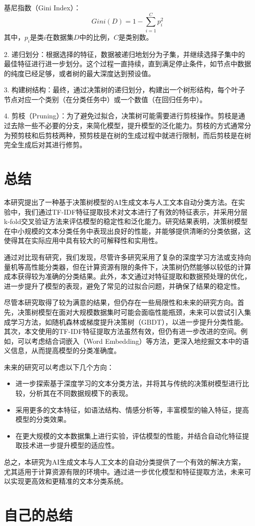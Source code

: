\documentclass[UTF8]{ctexart}
\begin{document}
   基尼指数（Gini Index）：
   \[
   Gini(D) = 1 - \sum_{i=1}^{C} p_i^2
   \]
   其中，\(p_i\)是类\(i\)在数据集\(D\)中的比例，\(C\)是类别数。

2. 递归划分：根据选择的特征，数据被递归地划分为子集，并继续选择子集中的最佳特征进行进一步划分。这个过程一直持续，直到满足停止条件，如节点中数据的纯度已经足够，或者树的最大深度达到预设值。

3. 构建树结构：最终，通过决策树的递归划分，构建出一个树形结构，每个叶子节点对应一个类别（在分类任务中）或一个数值（在回归任务中）。

4. 剪枝（Pruning）：为了避免过拟合，决策树可能需要进行剪枝操作。剪枝是通过去除一些不必要的分支，来简化模型，提升模型的泛化能力。剪枝的方式通常分为预剪枝和后剪枝两种，预剪枝是在树的生成过程中就进行限制，而后剪枝是在树完全生成后对其进行修剪。
\section{总结}

本研究提出了一种基于决策树模型的AI生成文本与人工文本自动分类方法。在实验中，我们通过TF-IDF特征提取技术对文本进行了有效的特征表示，并采用分层k-fold交叉验证方法来评估模型的稳定性和泛化能力。研究结果表明，决策树模型在中小规模的文本分类任务中表现出良好的性能，并能够提供清晰的分类依据，这使得其在实际应用中具有较大的可解释性和实用性。

通过对比现有研究，我们发现，尽管许多研究采用了复杂的深度学习方法或支持向量机等高性能分类器，但在计算资源有限的条件下，决策树仍然能够以较低的计算成本获得较为准确的分类结果。此外，本文通过对特征提取和数据预处理的优化，进一步提升了模型的表现，避免了常见的过拟合问题，并确保了结果的稳定性。

尽管本研究取得了较为满意的结果，但仍存在一些局限性和未来的研究方向。首先，决策树模型在面对大规模数据集时可能会面临性能瓶颈，未来可以尝试引入集成学习方法，如随机森林或梯度提升决策树（GBDT），以进一步提升分类性能。其次，本文使用的TF-IDF特征提取方法虽然有效，但仍有进一步改进的空间。例如，可以考虑结合词嵌入（Word Embedding）等方法，更深入地挖掘文本中的语义信息，从而提高模型的分类准确度。

未来的研究可以考虑以下几个方向：
\begin{itemize}
    \item 进一步探索基于深度学习的文本分类方法，并将其与传统的决策树模型进行比较，分析其在不同数据规模下的表现。
    \item 采用更多的文本特征，如语法结构、情感分析等，丰富模型的输入特征，提高模型的分类效果。
    \item 在更大规模的文本数据集上进行实验，评估模型的性能，并结合自动化特征提取技术进一步提升模型的适应性。
\end{itemize}

总之，本研究为AI生成文本与人工文本的自动分类提供了一个有效的解决方案，尤其适用于计算资源有限的环境中。通过进一步优化模型和特征提取方法，未来可以实现更高效和更精准的文本分类系统。


\section{自己的总结}




\end{document}
